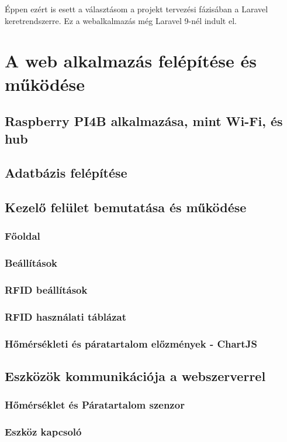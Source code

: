 \documentclass[
]{thesis-ekf}
\theoremstyle{definition}
\theoremstyle{remark}
\begin{document}
	Éppen ezért is esett a választásom a projekt tervezési fázisában a Laravel keretrendszerre. Ez a webalkalmazás még Laravel 9-nél indult el.
	
	\chapter{A web alkalmazás felépítése és működése}
	\section{Raspberry PI4B alkalmazása, mint Wi-Fi, és hub}
	\section{Adatbázis felépítése}\label{database}
	\section{Kezelő felület bemutatása és működése}
	\subsection{Főoldal}
	\subsection{Beállítások}
	\subsection{RFID beállítások}
	\subsection{RFID használati táblázat}
	\subsection{Hőmérsékleti és páratartalom előzmények - ChartJS}
	\section{Eszközök kommunikációja a webszerverrel}\label{csatlakozas-a-webszerverre}
	\subsection{Hőmérséklet és Páratartalom szenzor}
	\subsection{Eszköz kapcsoló}
\end{document}
